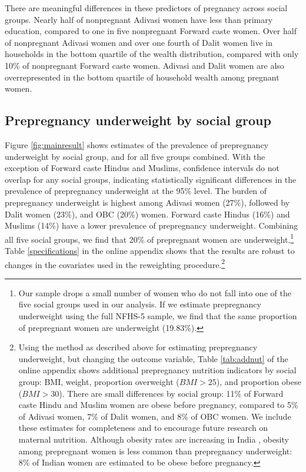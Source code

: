 \documentclass[12pt]{article}
\begin{document}
There are meaningful differences in these predictors of pregnancy across social groups. Nearly half of nonpregnant Adivasi women have less than primary education, compared to one in five nonpregnant Forward caste women. Over half of nonpregnant Adivasi women and over one fourth of Dalit women live in households in the bottom quartile of the wealth distribution, compared with only 10\% of nonpregnant Forward caste women. Adivasi and Dalit women are also overrepresented in the bottom quartile of household wealth among pregnant women.

\subsection*{Prepregnancy underweight by social group}

Figure \ref{fig:mainresult} shows estimates of the prevalence of prepregnancy underweight by social group, and for all five groups combined. With the exception of Forward caste Hindus and Muslims, confidence intervals do not overlap for any social groups, indicating statistically significant differences in the prevalence of prepregnancy underweight at the 95\% level. The burden of prepregnancy underweight is highest among Adivasi women (27\%), followed by Dalit women (23\%), and OBC (20\%) women.  Forward caste Hindus (16\%) and Muslims (14\%) have a lower prevalence of prepregnancy underweight. Combining all five social groups, we find that 20\% of prepregnant women are underweight.\footnote{Our sample drops a small number of women who do not fall into one of the five social groups used in our analysis.  If we estimate prepregnancy underweight using the full NFHS-5 sample, we find that the same proportion of prepregnant women are underweight (19.83\%).} Table \ref{specifications} in the online appendix shows that the results are robust to changes in the covariates used in the reweighting procedure.\footnote{Using the method as described above for estimating prepregnancy underweight, but changing the outcome variable, Table \ref{tab:addnut} of the online appendix shows additional prepregnancy nutrition indicators by social group: BMI, weight, proportion overweight ($BMI>25$), and proportion obese ($BMI>30$).  There are small differences by social group: 11\% of Forward caste Hindu and Muslim women are obese before pregnancy, compared to 5\% of Adivasi women, 7\% of Dalit women, and 8\% of OBC women.  We include these estimates for completeness and to encourage future research on maternal nutrition.  Although obesity rates are increasing in India \citep{luhar2020forecasting}, obesity among prepregnant women is less common than prepregnancy underweight: 8\% of Indian women are estimated to be obese before pregnancy.}  
\end{document}
